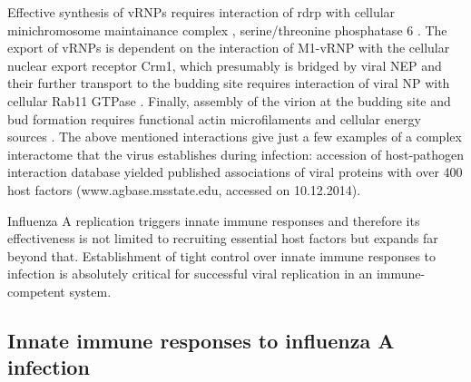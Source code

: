 	Effective synthesis of \glspl{vRNP} requires interaction of \gls{rdrp} with cellular minichromosome maintainance complex \parencite{Kawaguchi2007}, serine/threonine phosphatase 6 \parencite{York2014}. The export of \glspl{vRNP} is dependent on the interaction of \gls{M1}-\gls{vRNP} with the cellular nuclear export receptor Crm1, which presumably is bridged by viral \gls{NEP} \parencite{Brunotte2014} and their further transport to the budding site requires interaction of viral \gls{NP} with cellular Rab11 GTPase \parencite{Eisfeld2011}. Finally, assembly of the virion at the budding site and bud formation requires functional actin microfilaments and cellular energy sources \parencite{Nayak2004}. 	The above mentioned interactions give just a few examples of a complex interactome that the virus establishes during infection: accession of host-pathogen interaction database  \parencite{Kumar2010} yielded published associations of viral proteins with over 400 host factors (www.agbase.msstate.edu, accessed on 10.12.2014). 
	
	Influenza A replication triggers innate immune responses and therefore its effectiveness is not limited to recruiting essential host factors but expands far beyond that. Establishment of tight control over innate immune responses to infection is absolutely critical for successful viral replication in an immune-competent system. 
	
			
	
	\subsection{Innate immune responses to influenza A infection}
	
	

